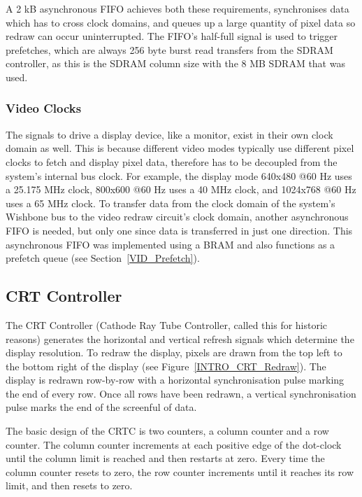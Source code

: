 A 2 kB asynchronous FIFO achieves both these requirements, synchronises data
which has to cross clock domains, and queues up a large quantity of pixel data so
redraw can occur uninterrupted. The FIFO's half-full signal is used to trigger
prefetches, which are always 256 byte burst read transfers from the SDRAM
controller, as this is the SDRAM column size with the 8 MB SDRAM that was used.


\subsubsection{Video Clocks}
The signals to drive a display device, like a monitor, exist in their own clock
domain as well. This is because different video modes typically use different
pixel clocks to fetch and display pixel data, therefore has to be decoupled from
the system's internal bus clock. For example, the display mode 640x480 @60 Hz
uses a 25.175 MHz clock, 800x600 @60 Hz uses a 40 MHz clock, and 1024x768 @60 Hz uses
a 65 MHz clock. To transfer data from the clock domain of the system's Wishbone
bus to the video redraw circuit's clock domain, another asynchronous FIFO is
needed, but only one since data is transferred in just one direction. This
asynchronous FIFO was implemented using a BRAM and also functions as a prefetch
queue (see Section~\ref{VID_Prefetch}).


\subsection{CRT Controller}
\label{VID_CRTC}

The CRT Controller (Cathode Ray Tube Controller, called this for historic
reasons) generates the horizontal and vertical refresh signals which determine
the display resolution. To redraw the display, pixels are drawn from the top
left to the bottom right of the display\cite{VGA_Programmers} (see
Figure~\ref{INTRO_CRT_Redraw}). The display is redrawn row-by-row with a
horizontal synchronisation pulse marking the end of every row. Once all rows have
been redrawn, a vertical synchronisation pulse marks the end of the screenful of
data.

The basic design of the CRTC is two counters, a column counter and a row counter.
The column counter increments at each positive edge of the dot-clock until the
column limit is reached and then restarts at zero. Every time the column counter
resets to zero, the row counter increments until it reaches its row limit, and
then resets to zero.



